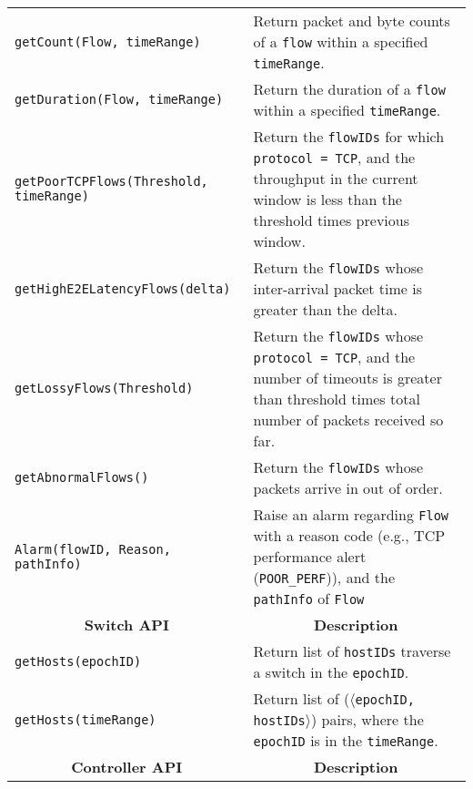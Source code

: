 \begin{table}
{\begin{tabular}{@{}l@{}p{3.85in}@{}}
  \texttt{getCount(Flow, timeRange)} & Return packet and byte counts of a {\tt flow}
                                       within a specified {\tt timeRange}. \\
  \texttt{getDuration(Flow, timeRange)} & Return the duration of a {\tt flow} within
                                          a specified {\tt timeRange}. \\
  \texttt{getPoorTCPFlows(Threshold, timeRange)} & Return the {\tt flowIDs} for
                                        which {\tt protocol = TCP}, and the throughput in the current window is less than the threshold times previous window.  \\
  \texttt{getHighE2ELatencyFlows(delta)} & Return the {\tt flowIDs} whose inter-arrival packet time is greater than the delta. \\
  \texttt{getLossyFlows(Threshold)} & Return the {\tt flowIDs} whose {\tt protocol = TCP}, and the number of timeouts is greater than threshold times total number of packets received so far. \\
  \texttt{getAbnormalFlows()} & Return the {\tt flowIDs} whose packets arrive in out of order. \\
  \texttt{Alarm(flowID, Reason, pathInfo)} & Raise an alarm regarding
                                             {\tt Flow} with a reason code (e.g., TCP
                                             performance alert
                                             (\texttt{POOR\_PERF})), and the {\tt pathInfo} of {\tt Flow} \\
  \midrule
  \multicolumn{1}{c}{\textbf{Switch API}} & \multicolumn{1}{c}{\textbf{Description}} \\
  \midrule
  \texttt{getHosts(epochID)} & Return list of {\tt hostIDs} traverse a switch in the {\tt epochID}. \\
  \texttt{getHosts(timeRange)} & Return list of ($\langle${\tt epochID, hostIDs}$\rangle$) pairs, where the {\tt epochID} is in the {\tt timeRange}. \\
  \midrule
  \multicolumn{1}{c}{\textbf{Controller API}} & \multicolumn{1}{c}{\textbf{Description}} \\
  \midrule


\end{tabular}}
\end{table}
